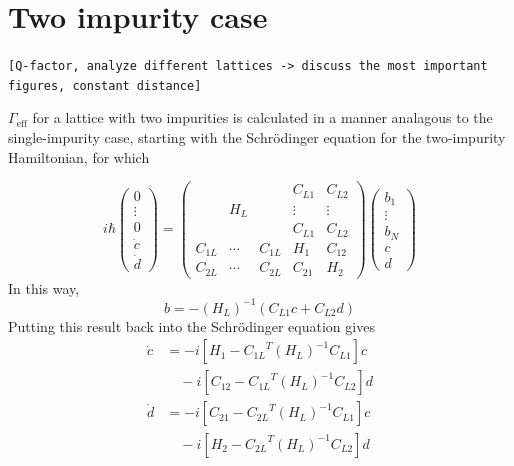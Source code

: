 \documentclass[aps,pra,superscriptaddress,twocolumn]{revtex4-1}
\newcommand{\commentSB}[1]{\texttt{\color{blue}[#1]}}
\newcommand{\commentSO}[1]{\texttt{\color{orange}[#1]}}
\begin{document}
\section{Two impurity case}
\commentSO{Q-factor, analyze different lattices -> discuss the most important figures, constant distance}

$\Gamma_\text{eff}$ for a lattice with two impurities is calculated in a manner analagous to the single-impurity case, starting with the Schr\"odinger equation for the two-impurity Hamiltonian, for which 

\begin{equation}
    i \hbar \begin{pmatrix}
        0 \\ \vdots \\ 0 \\ \dot{c} \\ \dot{d}
    \end{pmatrix}
    = \begin{pmatrix}
        ~ & ~ & ~ &   C_{L1} & C_{L2} \\ 
        ~ & H_L & ~ & \vdots & \vdots \\
        ~ & ~ & ~ & C_{L1} &  C_{L2} \\
        C_{1L} & \cdots & C_{1L} & H_1 & C_{12} \\
        C_{2L} & \cdots & C_{2L} & C_{21} & H_2  
    \end{pmatrix} 
    \begin{pmatrix}
        b_1 \\ \vdots \\ b_N \\ c \\ d
    \end{pmatrix}
    \label{eqn:blockH2}
\end{equation} 
In this way, 
\begin{equation}
    b = -(H_L)^{-1} (C_{L1} c + C_{L2} d)
\end{equation}
Putting this result back into the Schr\"odinger equation gives
\begin{subequations}
\begin{align}
    \dot{c} &= -i \left[  H_1 - {C_{1L}}^T (H_L)^{-1} C_{L1}\right] c \nonumber\\
     &\quad- i \left[  C_{12} - {C_{1L}}^T (H_L)^{-1} C_{L2} \right] d \\
    \dot{d} &= -i \left[  C_{21} - {C_{2L}}^T (H_L)^{-1} C_{L1} \right] c \nonumber\\
     &\quad -i \left[  H_2 - {C_{2L}}^T (H_L)^{-1} C_{L2}\right] d
\end{align}
\end{subequations}
\end{document}
